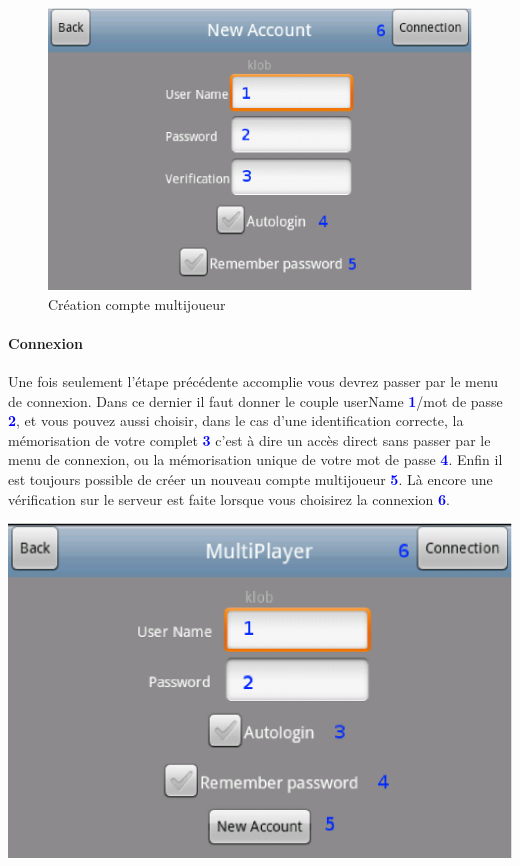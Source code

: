 	
	\begin{figure}[h]
	\centering
		\includegraphics[scale=0.7]{Manuel/Img/18.eps}
		\caption{Création compte multijoueur}
	\end{figure}
	
	\paragraph{Connexion}
		Une fois seulement l'étape précédente accomplie vous devrez passer par le menu
		de connexion. Dans ce dernier il faut donner le couple
		userName \textcolor{blue}{\textbf{1}}/mot de passe
		\textcolor{blue}{\textbf{2}}, et vous pouvez aussi choisir, dans le cas d'une
		identification correcte, la mémorisation de votre complet
		\textcolor{blue}{\textbf{3}} c'est à dire un accès direct sans passer par le
		menu de connexion, ou la mémorisation unique de votre mot de passe
		\textcolor{blue}{\textbf{4}}. Enfin il est toujours possible de créer un
		nouveau compte multijoueur \textcolor{blue}{\textbf{5}}. Là encore une
		vérification sur le serveur est faite lorsque vous choisirez la connexion
		\textcolor{blue}{\textbf{6}}.
		
		\begin{center}
			\includegraphics[scale=0.7]{Manuel/Img/17.eps}
		\end{center}
	
